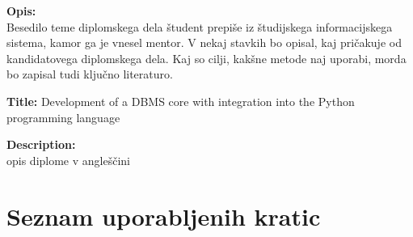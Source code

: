 \documentclass[a4paper,12pt,openright]{book}
\newcommand{\ttitleEn}{Development of a DBMS core with integration into the Python programming language}
\newcommand{\clearemptydoublepage}{\newpage{\pagestyle{empty}\cleardoublepage}}
\begin{document}
\bigskip
\noindent\textbf{Opis:}\\
Besedilo teme diplomskega dela študent prepiše iz študijskega informacijskega sistema, kamor ga je vnesel mentor. 
V nekaj stavkih bo opisal, kaj pričakuje od kandidatovega diplomskega dela. 
Kaj so cilji, kakšne metode naj uporabi, morda bo zapisal tudi ključno literaturo.

\bigskip
\noindent\textbf{Title:} \ttitleEn

\bigskip
\noindent\textbf{Description:}\\
opis diplome v angleščini

\vfill



\vspace{2cm}

\clearemptydoublepage


\clearemptydoublepage


\clearemptydoublepage


\setcounter{tocdepth}{2}
\pagestyle{empty}
\def\thepage{}%
\tableofcontents{}


\clearemptydoublepage


\chapter*{Seznam uporabljenih kratic}
\end{document}
